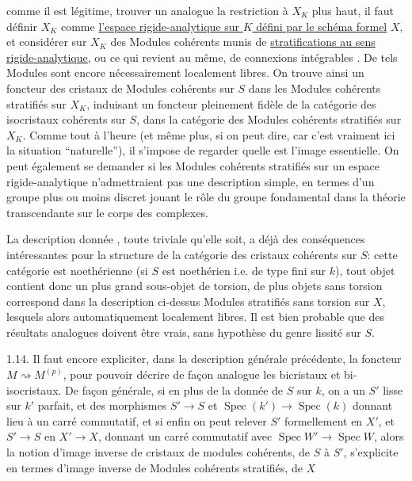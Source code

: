 comme il est légitime, trouver un analogue   la restriction à $X_K$  plus haut, il faut définir $X_K$ comme \uline{l'espace rigide-analytique sur $K$ défini par le schéma formel} $X$, et considérer sur $X_K$ des Modules cohérents munis de  \uline{stratifications au sens rigide-analytique}, ou ce qui revient au même, de connexions intégrables . De tels Modules sont encore nécessairement localement libres. On trouve ainsi un foncteur des cristaux de Modules cohérents sur $S$ dans les Modules cohérents stratifiés sur $X_K$, induisant un foncteur pleinement fidèle de la catégorie des isocristaux cohérents sur $S$, dans la catégorie des Modules cohérents stratifiés sur $X_K$. Comme tout à l'heure (et même plus, si on peut dire, car c'est vraiment  ici la situation ``naturelle''), il s'impose de regarder quelle est l'image essentielle. On peut également se demander si les Modules cohérents stratifiés sur un espace rigide-analytique n'admettraient pas une description simple, en termes d'un groupe plus ou moins discret jouant le rôle du groupe fondamental dans la théorie transcendante sur le corps des complexes.

 La description donnée , toute triviale qu'elle soit, a déjà des conséquences intéressantes pour la structure de la catégorie des cristaux  cohérents sur $S$:  cette catégorie est noethérienne (si $S$ est noethérien i.e. de type fini sur $k$), tout objet contient donc un plus grand sous-objet de torsion, de plus   objets sans torsion correspond dans la description ci-dessus   Modules stratifiés sans torsion sur $X$, lesquels   alors automatiquement localement libres. Il est bien probable que des résultats analogues doivent être vrais, sans hypothèse du genre lissité sur $S$.

1.14. Il faut encore expliciter, dans la description générale précédente, la  foncteur $M\rightsquigarrow M^{(p)}$, pour pouvoir décrire de façon analogue les bicristaux et bi-isocristaux. De façon générale, si en plus de la donnée de $S$ sur $k$, on a un $S'$ lisse sur $k'$ parfait, et des morphismes $S'\longrightarrow S$ et $\operatorname{Spec}(k')\longrightarrow\operatorname{Spec}(k)$ donnant lieu à un carré commutatif, et si enfin on peut relever $S'$ formellement en $X'$, et $S'\longrightarrow S$ en $X'\longrightarrow X$, donnant un carré commutatif avec $\operatorname{Spec}W'\longrightarrow\operatorname{Spec}W$, alors la notion d'image inverse de cristaux de modules cohérents, de $S$ à $S'$, s'explicite en termes d'image inverse de Modules cohérents stratifiés, de $X$
